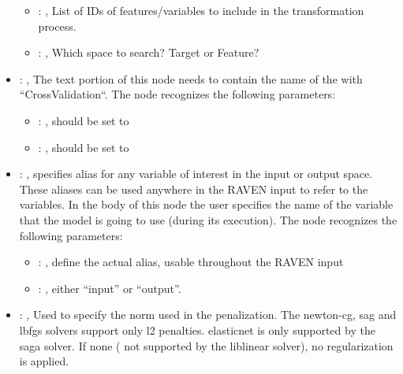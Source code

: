 \begin{itemize}
\begin{itemize}
        \item {}: , 
          List of IDs of features/variables to include in the transformation process.

        \item {}: , 
          Which space to search? Target or Feature?
      \end{itemize}

    \item {}: , 
      The text portion of this node needs to contain the name of the  with
               ``CrossValidation``.
      The  node recognizes the following parameters:
        \begin{itemize}
          \item {}: , 
            should be set to 
          \item {}: , 
            should be set to 
      \end{itemize}

    \item {}: , 
      specifies alias for         any variable of interest in the input or output space. These
      aliases can be used anywhere in the RAVEN input to         refer to the variables. In the body
      of this node the user specifies the name of the variable that the model is going to use
      (during its execution).
      The  node recognizes the following parameters:
        \begin{itemize}
          \item {}: , 
            define the actual alias, usable throughout the RAVEN input
          \item {}: , 
            either ``input'' or ``output''.
      \end{itemize}

    \item {}: , 
      Used to specify the norm used in the penalization. The newton-cg, sag and lbfgs solvers
      support only l2 penalties. elasticnet is only supported by the saga solver. If none (
      not supported by the liblinear solver), no regularization is applied.


\end{itemize}
